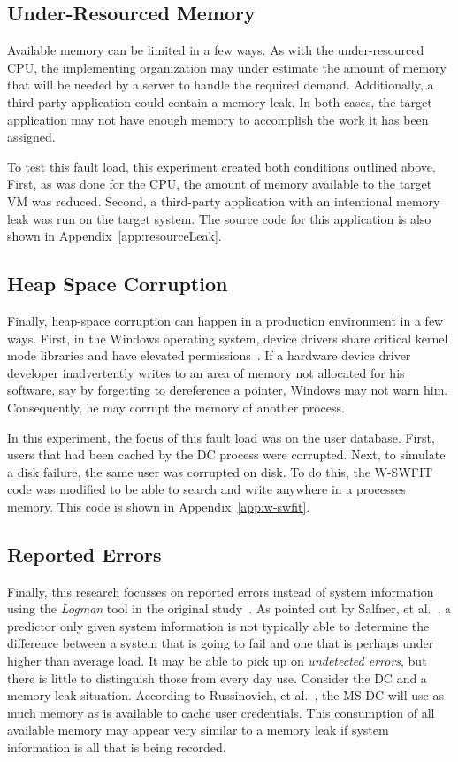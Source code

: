 \subsection{Under-Resourced Memory} \label{sec:extUnderResourcedMem}
Available memory can be limited in a few ways.  As with the under-resourced
\ac{CPU}, the implementing organization may under estimate the amount of memory
that will be needed by a server to handle the required demand.  Additionally, a
third-party application could contain a memory leak.  In both cases, the target
application may not have enough memory to accomplish the work it has been
assigned.

To test this fault load, this experiment created both conditions outlined
above. First, as was done for the \ac{CPU}, the amount of memory available to
the target \ac{VM} was reduced.  Second, a third-party application with an
intentional memory leak was run on the target system.  The source code for this
application is also shown in Appendix~\ref{app:resourceLeak}.

\subsection{Heap Space Corruption} \label{sec:extHeapSpaceCorrupt}
Finally, heap-space corruption can happen in a production environment in a few
ways.  First, in the Windows operating system, device drivers share critical
kernel mode libraries and have elevated permissions~\cite{russinovich2009}.  If
a hardware device driver developer inadvertently writes to an area of memory
not allocated for his software, say by forgetting to dereference a pointer,
Windows may not warn him.  Consequently, he may corrupt the memory of another
process.

In this experiment, the focus of this fault load was on the user database.
First, users that had been cached by the \ac{DC} process were corrupted.  Next,
to simulate a disk failure, the same user was corrupted on disk.  To do this,
the \ac{W-SWFIT} code was modified to be able to search and write anywhere in a
processes memory.  This code is shown in Appendix~\ref{app:w-swfit}.

\subsection{Reported Errors} \label{sec:extReportedErrors}
Finally, this research focusses on reported errors instead of system
information using the \emph{Logman} tool in the original
study~\cite{irrera2015}.  As pointed out by Salfner, et
al.~\cite{salfnerSurvey}, a predictor only given system information is not
typically able to determine the difference between a system that is going to
fail and one that is perhaps under higher than average load.  It may be able to
pick up on \emph{undetected errors}, but there is little to distinguish those
from every day use.  Consider the \ac{DC} and a memory leak situation.
According to Russinovich, et al.~\cite{russinovich2009}, the \ac{MS} \ac{DC}
will use as much memory as is available to cache user credentials.  This
consumption of all available memory may appear very similar to a memory leak if
system information is all that is being recorded.

